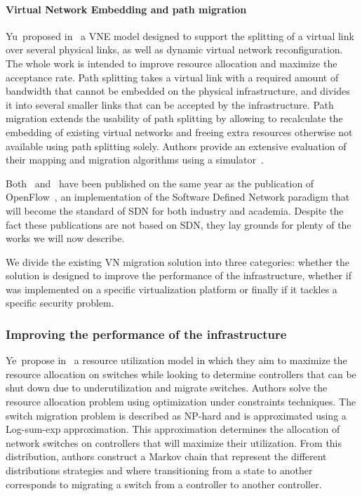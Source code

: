 \paragraph{Virtual Network Embedding and path migration}
Yu~\etal proposed in~\cite{VNE-Yu2008} a VNE model designed to support the splitting of a virtual link over several physical links, as well as dynamic virtual network reconfiguration.
The whole work is intended to improve resource allocation and maximize the acceptance rate. 
Path splitting takes a virtual link with a required amount of bandwidth that cannot be embedded on the physical infrastructure, and divides it into several smaller links that can be accepted by the infrastructure.
Path migration extends the usability of path splitting by allowing to recalculate the embedding of existing virtual networks and freeing extra resources otherwise not available using path splitting solely.
Authors provide an extensive evaluation of their mapping and migration algorithms using a simulator~\cite{vnesimulator}.

Both~\cite{VROOM-Wang2008} and~\cite{VNE-Yu2008} have been published on the same year as the publication of OpenFlow~\cite{Openflow-McKeown2008}, an implementation of the Software Defined Network paradigm that will become the standard of SDN for both industry and academia.
Despite the fact these publications are not based on SDN, they lay grounds for plenty of the works we will now describe.

We divide the existing VN migration solution into three categories: whether the solution is designed to improve the performance of the infrastructure, whether if was implemented on a specific virtualization platform or finally if it tackles a specific security problem.

\subsubsection{Improving the performance of the infrastructure}
Ye~\etal propose in~\cite{Ye2017a} a resource utilization model in which they aim to maximize the resource allocation on switches while looking to determine controllers that can be shut down due to underutilization and migrate switches.
Authors solve the resource allocation problem using optimization under constraints techniques. 
The switch migration problem is described as NP-hard and is approximated using a Log-sum-exp approximation.
This approximation determines the allocation of network switches on controllers that will maximize their utilization. 
From this distribution, authors construct a Markov chain that represent the different distributions strategies and where transitioning from a state to another corresponds to migrating a switch from a controller to another controller.

